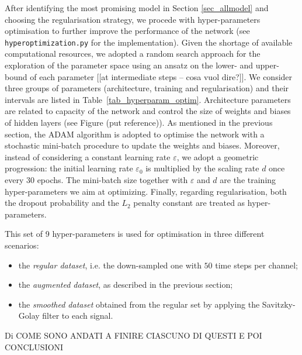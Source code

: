 \documentclass{article}
\begin{document}
After identifying  the most promising model in Section \ref{sec_allmodel} and choosing the  regularisation strategy, we procede with hyper-parameters optimisation to further improve the performance of the network (see \verb|hyperoptimization.py| for the implementation). 
 Given the shortage of available computational resources, we adopted a random search approach for the exploration of the parameter space using an ansatz  on the lower- and upper-bound of each parameter [[at intermediate steps -- cosa vuol dire?]]. 
 We consider three groups of  parameters (architecture, training and regularisation) and their intervals are listed in Table~\ref{tab_hyperparam_optim}.  
 Architecture parameters are related to capacity of the network and control the size of weights and biases of hidden layers (see Figure (put reference)). 
 As mentioned in the previous section, the ADAM algorithm is adopted to optimise the network with a stochastic mini-batch procedure to update the weights and biases. 
Moreover,  instead of considering a constant learning rate $\varepsilon$, we adopt a geometric progression: the initial learning rate $\varepsilon_0$ is multiplied by the scaling rate $d$ once every 30 epochs. 
The  mini-batch size  together with $\varepsilon$ and $d$ are the training   hyper-parameters we aim at optimizing. 
Finally, regarding regularisation, both the dropout probability and the $L_2$ penalty constant are treated as hyper-parameters.
 
This set of 9  hyper-parameters is used for optimisation in three different scenarios: 
\begin{itemize}
\item the \emph{regular dataset}, i.e. the down-sampled one with $50$ time steps per channel; 
\item the \emph{augmented dataset}, as described in the previous section;%
\item the \emph{smoothed dataset} obtained from the regular set by applying the Savitzky-Golay filter to each  signal.
\end{itemize}

Di COME SONO ANDATI A FINIRE CIASCUNO DI QUESTI
E POI CONCLUSIONI 
\end{document}
